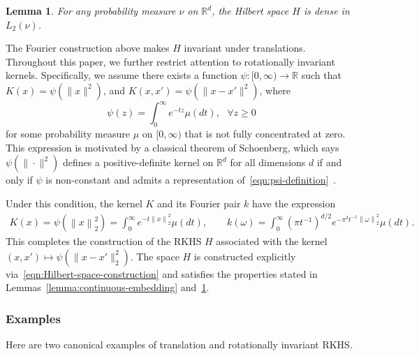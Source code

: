 \documentclass[sn-mathphys-num]{sn-jnl}%
\numberwithin{equation}{section}
\newcommand{\R}{\mathbb{R}}
\newcommand{\kernel}{K}
\newcommand{\norm}[1]{\left\|{#1}\right\|} %
\newtheorem{lemma}{Lemma}
\newcommand{\profile}{\psi}
\theoremstyle{thmstyleone}%
\theoremstyle{thmstyletwo}%
\theoremstyle{thmstylethree}%
\begin{document}
\vspace{.5em}
\begin{lemma}
\label{lemma:denseness-of-H-in-L-2}
For any probability measure $\nu$ on $\R^d$, the Hilbert
space $H$ is dense in $L_2(\nu)$.
\end{lemma} 

\vspace{.5em}

The Fourier construction above makes $H$ invariant under translations.
Throughout this paper, we further restrict attention to rotationally invariant kernels. 
Specifically, we assume there exists a function $\psi : [0,\infty) \to \R$ such that
$\kernel(x) = \psi(\|x\|^2)$, and 
	$\kernel(x,x') = \psi(\|x-x'\|^2)$, where %
\begin{equation}
\label{eqn:psi-definition}
	\psi(z) = \int_0^\infty e^{-tz} \mu(dt),~~~\forall z \ge 0
\end{equation}
for some probability measure $\mu$ on $[0, \infty)$ that is not fully concentrated at zero.
This expression is motivated by a classical theorem of Schoenberg, which says
$\psi(\|\cdot\|^2)$ defines a positive-definite kernel on $\R^d$ for all dimensions $d$ if and only if 
$\psi$ is non-constant and admits a representation of~\eqref{eqn:psi-definition}~\cite{Schoenberg38}.

Under this condition, the kernel $\kernel$ and its Fourier pair $k$ have the expression
\begin{equation}
\begin{split} 
	\kernel(x) = \profile(\norm{x}_2^2) = \int_0^\infty e^{-t\norm{x}_2^2}\mu(dt),\quad\quad
	k(\omega) = \int_0^\infty 
		(\pi t^{-1})^{d/2} e^{- \pi^2 t^{-1} \norm{\omega}_2^2}\mu(dt).
\end{split} 
\end{equation}
This completes the construction of the RKHS $H$ associated with the kernel
$(x,x') \mapsto \psi(\|x-x'\|_2^2)$. The space $H$ is constructed explicitly via~\eqref{eqn:Hilbert-space-construction} and satisfies the 
properties stated in Lemmas~\ref{lemma:continuous-embedding} and~\ref{lemma:denseness-of-H-in-L-2}.


\subsubsection{Examples} 
Here are two canonical examples of translation and rotationally invariant  RKHS.
\end{document}
